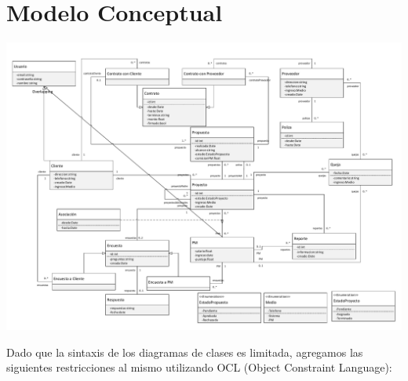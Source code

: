 \documentclass{article}
\theoremstyle{definition}
\theoremstyle{remark}
\begin{document}
\pagebreak

\section{Modelo Conceptual}

\includegraphics[height=\textwidth,angle=-270]{images/conceptual.pdf}

\pagebreak

Dado que la sintaxis de los diagramas de clases es limitada, agregamos las siguientes restricciones al mismo utilizando OCL (Object Constraint Language):
\end{document}
